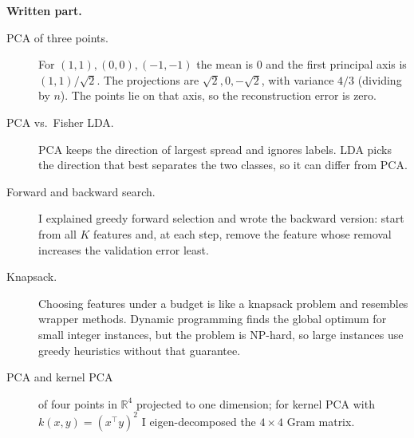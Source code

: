 \textbf{Written part.}
\begin{description}
  \item[PCA of three points.] For $(1,1),(0,0),(-1,-1)$ the mean is $0$ and the first principal axis is $(1,1)/\sqrt2$. The projections are $\sqrt2,0,-\sqrt2$, with variance $4/3$ (dividing by $n$). The points lie on that axis, so the reconstruction error is zero.
  \item[PCA vs.\ Fisher LDA.] PCA keeps the direction of largest spread and ignores labels. LDA picks the direction that best separates the two classes, so it can differ from PCA.
  \item[Forward and backward search.] I explained greedy forward selection and wrote the backward version: start from all $K$ features and, at each step, remove the feature whose removal increases the validation error least.
  \item[Knapsack.] Choosing features under a budget is like a knapsack problem and resembles wrapper methods. Dynamic programming finds the global optimum for small integer instances, but the problem is NP-hard, so large instances use greedy heuristics without that guarantee.
  \item[PCA and kernel PCA] of four points in $\mathbb R^4$ projected to one dimension; for kernel PCA with $k(x,y)=(x^\top y)^2$ I eigen-decomposed the $4\times4$ Gram matrix.
\end{description}

